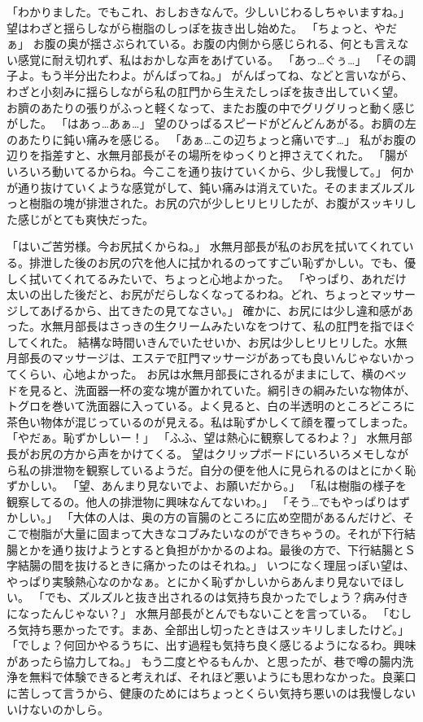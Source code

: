 「わかりました。でもこれ、おしおきなんで。少しいじわるしちゃいますね。」
望はわざと揺らしながら樹脂のしっぽを抜き出し始めた。
「ちょっと、やだぁ」
お腹の奥が揺さぶられている。お腹の内側から感じられる、何とも言えない感覚に耐え切れず、私はおかしな声をあげている。
「あっ…ぐぅ…」
「その調子よ。もう半分出たわよ。がんばってね。」
がんばってね、などと言いながら、わざと小刻みに揺らしながら私の肛門から生えたしっぽを抜き出していく望。
お臍のあたりの張りがふっと軽くなって、またお腹の中でグリグリっと動く感じがした。
「はあっ…あぁ…」
望のひっぱるスピードがどんどんあがる。お臍の左のあたりに鈍い痛みを感じる。
「あぁ…この辺ちょっと痛いです…」
私がお腹の辺りを指差すと、水無月部長がその場所をゆっくりと押さえてくれた。
「腸がいろいろ動いてるからね。今ここを通り抜けていくから、少し我慢して。」
何かが通り抜けていくような感覚がして、鈍い痛みは消えていた。そのままズルズルっと樹脂の塊が排泄された。お尻の穴が少しヒリヒリしたが、お腹がスッキリした感じがとても爽快だった。

「はいご苦労様。今お尻拭くからね。」
水無月部長が私のお尻を拭いてくれている。排泄した後のお尻の穴を他人に拭かれるのってすごい恥ずかしい。でも、優しく拭いてくれてるみたいで、ちょっと心地よかった。
「やっぱり、あれだけ太いの出した後だと、お尻がだらしなくなってるわね。どれ、ちょっとマッサージしてあげるから、出てきたの見てなさい。」
確かに、お尻には少し違和感があった。水無月部長はさっきの生クリームみたいなをつけて、私の肛門を指でほぐしてくれた。
結構な時間いきんでいたせいか、お尻は少しヒリヒリした。水無月部長のマッサージは、エステで肛門マッサージがあっても良いんじゃないかってくらい、心地よかった。
お尻は水無月部長にされるがままにして、横のベッドを見ると、洗面器一杯の変な塊が置かれていた。綱引きの綱みたいな物体が、トグロを巻いて洗面器に入っている。よく見ると、白の半透明のところどころに茶色い物体が混じっているのが見える。私は恥ずかしくて顔を覆ってしまった。
「やだぁ。恥ずかしいー！」
「ふふ、望は熱心に観察してるわよ？」
水無月部長がお尻の方から声をかけてくる。
望はクリップボードにいろいろメモしながら私の排泄物を観察しているようだ。自分の便を他人に見られるのはとにかく恥ずかしい。
「望、あんまり見ないでよ、お願いだから。」
「私は樹脂の様子を観察してるの。他人の排泄物に興味なんてないわ。」
「そう…でもやっぱりはずかしい。」
「大体の人は、奥の方の盲腸のところに広め空間があるんだけど、そこで樹脂が大量に固まって大きなコブみたいなのができちゃうの。それが下行結腸とかを通り抜けようとすると負担がかかるのよね。最後の方で、下行結腸とＳ字結腸の間を抜けるときに痛かったのはそれね。」
いつになく理屈っぽい望は、やっぱり実験熱心なのかなぁ。とにかく恥ずかしいからあんまり見ないでほしい。
「でも、ズルズルと抜き出されるのは気持ち良かったでしょう？病み付きになったんじゃない？」
水無月部長がとんでもないことを言っている。
「むしろ気持ち悪かったです。まあ、全部出し切ったときはスッキリしましたけど。」
「でしょ？何回かやるうちに、出す過程も気持ち良く感じるようになるわ。興味があったら協力してね。」
もう二度とやるもんか、と思ったが、巷で噂の腸内洗浄を無料で体験できると考えれば、それほど悪いようにも思わなかった。良薬口に苦しって言うから、健康のためにはちょっとくらい気持ち悪いのは我慢しないいけないのかしら。


